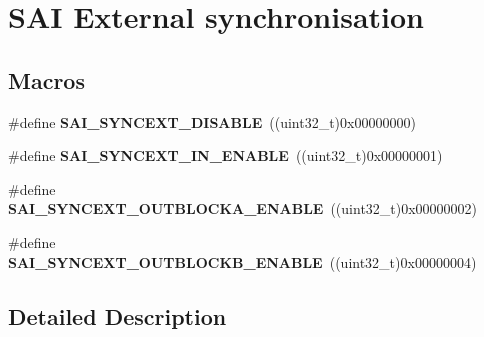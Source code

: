 \hypertarget{group___s_a_i___block___sync_ext}{}\section{S\+AI External synchronisation}
\label{group___s_a_i___block___sync_ext}
\subsection*{Macros}
\begin{DoxyCompactItemize}
\item 
\#define {\bfseries S\+A\+I\+\_\+\+S\+Y\+N\+C\+E\+X\+T\+\_\+\+D\+I\+S\+A\+B\+LE}~((uint32\+\_\+t)0x00000000)\hypertarget{group___s_a_i___block___sync_ext_ga184a9da633ee0c43a6117ca8a7521dda}{}\label{group___s_a_i___block___sync_ext_ga184a9da633ee0c43a6117ca8a7521dda}

\item 
\#define {\bfseries S\+A\+I\+\_\+\+S\+Y\+N\+C\+E\+X\+T\+\_\+\+I\+N\+\_\+\+E\+N\+A\+B\+LE}~((uint32\+\_\+t)0x00000001)\hypertarget{group___s_a_i___block___sync_ext_ga05572ce0b163fe7bd2269692929f84af}{}\label{group___s_a_i___block___sync_ext_ga05572ce0b163fe7bd2269692929f84af}

\item 
\#define {\bfseries S\+A\+I\+\_\+\+S\+Y\+N\+C\+E\+X\+T\+\_\+\+O\+U\+T\+B\+L\+O\+C\+K\+A\+\_\+\+E\+N\+A\+B\+LE}~((uint32\+\_\+t)0x00000002)\hypertarget{group___s_a_i___block___sync_ext_ga7b9b462c01a8fda3c43773c0a258ba47}{}\label{group___s_a_i___block___sync_ext_ga7b9b462c01a8fda3c43773c0a258ba47}

\item 
\#define {\bfseries S\+A\+I\+\_\+\+S\+Y\+N\+C\+E\+X\+T\+\_\+\+O\+U\+T\+B\+L\+O\+C\+K\+B\+\_\+\+E\+N\+A\+B\+LE}~((uint32\+\_\+t)0x00000004)\hypertarget{group___s_a_i___block___sync_ext_ga88598f159bfcb1fc2461122c8a18d0f6}{}\label{group___s_a_i___block___sync_ext_ga88598f159bfcb1fc2461122c8a18d0f6}

\end{DoxyCompactItemize}


\subsection{Detailed Description}
